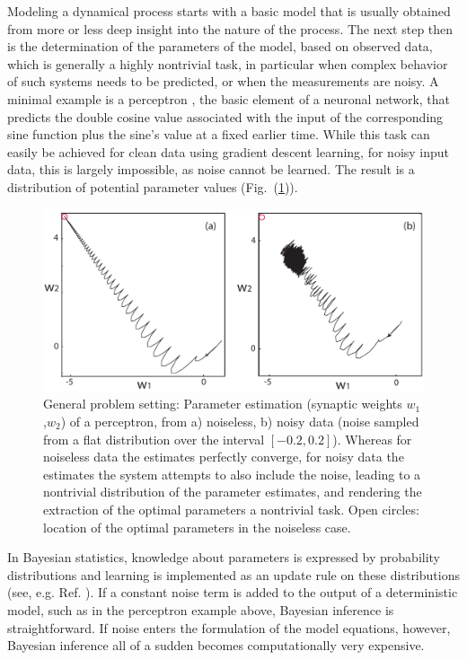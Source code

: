 \documentclass[11pt]{article}
\theoremstyle{definition}
\begin{document}
Modeling a dynamical process starts with a basic model that is usually obtained from more or less deep insight into the nature of the process. The next step then is the determination of the parameters of the model, based on observed data, which is generally a highly nontrivial task, in particular when complex behavior of such systems needs to be predicted, or when the measurements are noisy.
A minimal example is a perceptron \cite{rosenblatt_1958_perceptron, steeb_2004_problems}, the basic element of a neuronal network, that predicts the double cosine value associated with the input of the corresponding sine function plus the sine's value at a fixed earlier time. While this task can easily be achieved for clean data using gradient descent learning, for noisy input data, this is largely impossible, as noise cannot be learned. The result is a distribution of potential parameter values (Fig.~(\ref{neural})).
\begin{figure}[h]
    \centering
    \includegraphics[width=1.0\textwidth]{neuron.pdf}
    \caption{General problem setting: Parameter estimation (synaptic weights $w_1$,$w_2$) of a perceptron, from a) noiseless, b) noisy data (noise sampled from a flat distribution over the  interval $[-0.2,0.2]$). Whereas for noiseless data the estimates perfectly converge, for noisy data the estimates  the system attempts to also include the noise, leading to a nontrivial distribution of the parameter estimates, and rendering the extraction of the optimal parameters a nontrivial task. Open circles: location of the optimal parameters in the noiseless case.}
    \label{neural}
\end{figure}

In Bayesian statistics, knowledge about parameters is expressed by probability distributions and learning is implemented as an update rule on these distributions (see, e.g. Ref. \cite{box_2011_bayesian}).
If a constant noise term is added to the output of a deterministic model, such as in the perceptron example above, Bayesian inference is straightforward.
If noise enters the formulation of the model equations, however, Bayesian inference all of a sudden becomes computationally very expensive.
\end{document}
